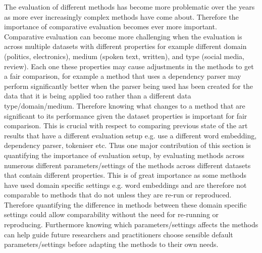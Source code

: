 The evaluation of different methods has become more problematic over the years as more ever increasingly complex methods have come about. Therefore the importance of comparative evaluation becomes ever more important. Comparative evaluation can become more challenging when the evaluation is across multiple datasets with different properties for example different domain (politics, electronics), medium (spoken text, written), and type (social media, review). Each one these properties may cause adjustments in the methods to get a fair comparison, for example a method that uses a dependency parser may perform significantly better when the parser being used has been created for the data that it is being applied too rather than a different data type/domain/medium. Therefore knowing what changes to a method that are significant to its performance given the dataset properties is important for fair comparison. This is crucial with respect to comparing previous state of the art results that have a different evaluation setup e.g. use a different word embedding, dependency parser, tokeniser etc. Thus one major contribution of this section is quantifying the importance of evaluation setup, by evaluating methods across numerous different parameters/settings of the methods across different datasets that contain different properties. This is of great importance as some methods have used domain specific settings e.g. word embeddings \citep{repro_vo_2015,repro_zhang_2016,repro_wang_2017} and are therefore not comparable to methods that do not \citep{repro_chen_2017,repro_li_2018} unless they are re-run or reproduced. Therefore quantifying the difference in methods between these domain specific settings could allow comparability without the need for re-running or reproducing.
Furthermore knowing which parameters/settings affects the methods can help guide future researchers and practitioners choose sensible default parameters/settings before adapting the methods to their own needs.
\\
